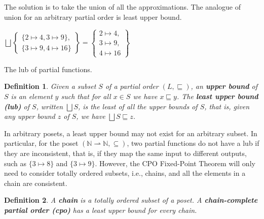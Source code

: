 \documentclass{tufte-handout}
\newtheorem{definition}{Definition}%
\begin{document}
The solution is to take the union of all the approximations. The
analogue of union for an arbitrary partial order is least upper bound.

\begin{marginfigure}
$\bigsqcup \left\{\!\! \begin{array}{l}
              \{ 2 \mapsto 4, 3 \mapsto 9 \}, \\
              \{ 3 \mapsto 9, 4 \mapsto 16 \} 
                 \end{array}\!\! \right\}
= \left\{\!\! \begin{array}{l}
        2 \mapsto 4, \\ 3 \mapsto 9, \\ 4 \mapsto 16 
    \end{array}\!\! \right\}$
\caption{The lub of partial functions.}
\end{marginfigure}

\begin{definition}
Given a subset $S$ of a partial order $(L,\sqsubseteq)$, an
\textbf{\emph{upper bound}} of $S$ is an element $y$ such that for all
$x \in S$ we have $x \sqsubseteq y$.  The \textbf{\emph{least upper
    bound (lub)}} of $S$, written $\bigsqcup S$, is the least of all
the upper bounds of $S$, that is, given any upper bound $z$ of $S$, we
have $\bigsqcup S \sqsubseteq z$.
\end{definition}

In arbitrary posets, a least upper bound may not exist for an
arbitrary subset. In particular, for the poset
$(\mathbb{N}{\rightharpoonup}\mathbb{N}, \subseteq)$, two partial
functions do not have a lub if they are inconsistent, that is, if they
map the same input to different outputs, such as $\{3\mapsto 8\}$ and
$\{3 \mapsto 9\}$. However, the CPO Fixed-Point Theorem will only need to
consider totally ordered subsets, i.e., chains, and all the elements
in a chain are consistent.

\begin{definition}
  A \textbf{\emph{chain}} is a totally ordered subset of a poset.  A
  \textbf{\emph{chain-complete partial order (cpo)}} has a least upper
  bound for every chain.
\end{definition}


\end{document}
